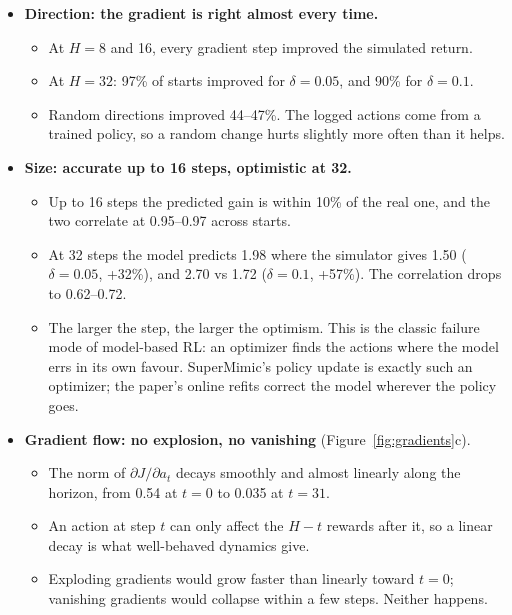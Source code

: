 \documentclass[10pt]{article}
\newcommand{\fig}[1]{Figure~\ref{#1}}
\begin{document}
\begin{itemize}
  \item \textbf{Direction: the gradient is right almost every time.}
  \begin{itemize}
    \item At $H = 8$ and 16, every gradient step improved the simulated return.
    \item At $H = 32$: 97\% of starts improved for $\delta = 0.05$, and 90\% for $\delta = 0.1$.
    \item Random directions improved 44--47\%. The logged actions come from a trained policy, so a
    random change hurts slightly more often than it helps.
  \end{itemize}
  \item \textbf{Size: accurate up to 16 steps, optimistic at 32.}
  \begin{itemize}
    \item Up to 16 steps the predicted gain is within 10\% of the real one, and the two correlate at
    0.95--0.97 across starts.
    \item At 32 steps the model predicts 1.98 where the simulator gives 1.50 ($\delta = 0.05$, +32\%),
    and 2.70 vs 1.72 ($\delta = 0.1$, +57\%). The correlation drops to 0.62--0.72.
    \item The larger the step, the larger the optimism. This is the classic failure mode of model-based
    RL: an optimizer finds the actions where the model errs in its own favour. SuperMimic's policy
    update is exactly such an optimizer; the paper's online refits correct the model wherever the
    policy goes.
  \end{itemize}
  \item \textbf{Gradient flow: no explosion, no vanishing} (\fig{fig:gradients}c).
  \begin{itemize}
    \item The norm of $\partial J/\partial a_t$ decays smoothly and almost linearly along the horizon,
    from 0.54 at $t = 0$ to 0.035 at $t = 31$.
    \item An action at step $t$ can only affect the $H - t$ rewards after it, so a linear decay is what
    well-behaved dynamics give.
    \item Exploding gradients would grow faster than linearly toward $t = 0$; vanishing gradients would
    collapse within a few steps. Neither happens.
  \end{itemize}
\end{itemize}
\end{document}
